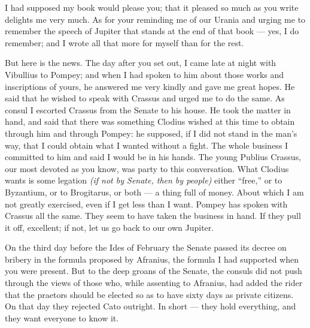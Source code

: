 

 I had supposed my book would please you; that it pleased so much as you write delights me very much. As for your reminding me of our Urania and urging me to remember the speech of Jupiter that stands at the end of that book --- yes, I do remember; and I wrote all that more for myself than for the rest.

 But here is the news. The day after you set out, I came late at night with Vibullius to Pompey; and when I had spoken to him about those works and inscriptions of yours, he answered me very kindly and gave me great hopes. He said that he wished to speak with Crassus and urged me to do the same. As consul I escorted Crassus from the Senate to his house. He took the matter in hand, and said that there was something Clodius wished at this time to obtain through him and through Pompey: he supposed, if I did not stand in the man's way, that I could obtain what I wanted without a fight. The whole business I committed to him and said I would be in his hands. The young Publius Crassus, our most devoted as you know, was party to this conversation. What Clodius wants is some legation \textit{(if not by Senate, then by people)} either ``free,'' or to Byzantium, or to Brogitarus, or both --- a thing full of money. About which I am not greatly exercised, even if I get less than I want. Pompey has spoken with Crassus all the same. They seem to have taken the business in hand. If they pull it off, excellent; if not, let us go back to our own Jupiter.

 On the third day before the Ides of February the Senate passed its decree on bribery in the formula proposed by Afranius, the formula I had supported when you were present. But to the deep groans of the Senate, the consuls did not push through the views of those who, while assenting to Afranius, had added the rider that the praetors should be elected so as to have sixty days as private citizens. On that day they rejected Cato outright. In short --- they hold everything, and they want everyone to know it.
